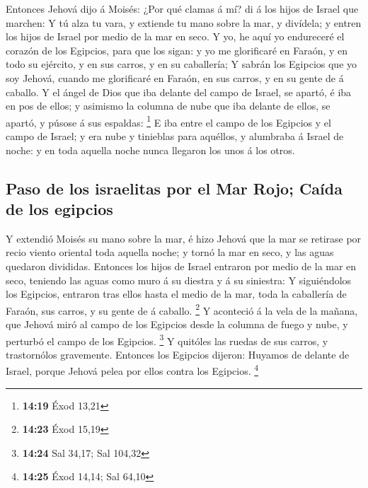  Entonces Jehová dijo á Moisés: ¿Por qué clamas á mí? di
á los hijos de Israel que marchen:  Y tú alza tu vara, y
extiende tu mano sobre la mar, y divídela; y entren los hijos de Israel
por medio de la mar en seco.  Y yo, he aquí yo endureceré
el corazón de los Egipcios, para que los sigan: y yo me glorificaré en
Faraón, y en todo su ejército, y en sus carros, y en su caballería;
 Y sabrán los Egipcios que yo soy Jehová, cuando me
glorificaré en Faraón, en sus carros, y en su gente de á caballo.
 Y el ángel de Dios que iba delante del campo de Israel,
se apartó, é iba en pos de ellos; y asimismo la columna de nube que iba
delante de ellos, se apartó, y púsose á sus espaldas: \footnote{\textbf{14:19}
  Éxod 13,21}  E iba entre el campo de los Egipcios y el
campo de Israel; y era nube y tinieblas para aquéllos, y alumbraba á
Israel de noche: y en toda aquella noche nunca llegaron los unos á los
otros.

\hypertarget{paso-de-los-israelitas-por-el-mar-rojo-cauxedda-de-los-egipcios}{%
\subsection{Paso de los israelitas por el Mar Rojo; Caída de los
egipcios}\label{paso-de-los-israelitas-por-el-mar-rojo-cauxedda-de-los-egipcios}}

 Y extendió Moisés su mano sobre la mar, é hizo Jehová
que la mar se retirase por recio viento oriental toda aquella noche; y
tornó la mar en seco, y las aguas quedaron divididas. 
Entonces los hijos de Israel entraron por medio de la mar en seco,
teniendo las aguas como muro á su diestra y á su siniestra:
 Y siguiéndolos los Egipcios, entraron tras ellos hasta
el medio de la mar, toda la caballería de Faraón, sus carros, y su gente
de á caballo. \footnote{\textbf{14:23} Éxod 15,19}  Y
aconteció á la vela de la mañana, que Jehová miró al campo de los
Egipcios desde la columna de fuego y nube, y perturbó el campo de los
Egipcios. \footnote{\textbf{14:24} Sal 34,17; Sal 104,32}
 Y quitóles las ruedas de sus carros, y trastornólos
gravemente. Entonces los Egipcios dijeron: Huyamos de delante de Israel,
porque Jehová pelea por ellos contra los Egipcios. \footnote{\textbf{14:25}
  Éxod 14,14; Sal 64,10}

